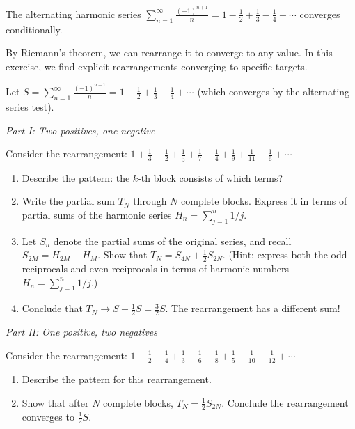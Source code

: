 \documentclass[
  10pt,
  letterpaper,
]{scrbook}
\begin{document}
The alternating harmonic series
\(\sum_{n=1}^{\infty} \frac{(-1)^{n+1}}{n} = 1 - \frac{1}{2} + \frac{1}{3} - \frac{1}{4} + \cdots\)
converges conditionally.

By Riemann's theorem, we can rearrange it to converge to any value. In
this exercise, we find explicit rearrangements converging to specific
targets.

Let
\(S = \sum_{n=1}^{\infty} \frac{(-1)^{n+1}}{n} = 1 - \frac{1}{2} + \frac{1}{3} - \frac{1}{4} + \cdots\)
(which converges by the alternating series test).

\emph{Part I: Two positives, one negative}

Consider the rearrangement:
\(1 + \frac{1}{3} - \frac{1}{2} + \frac{1}{5} + \frac{1}{7} - \frac{1}{4} + \frac{1}{9} + \frac{1}{11} - \frac{1}{6} + \cdots\)

\begin{enumerate}
\def\labelenumi{(\alph{enumi})}
\item
  Describe the pattern: the \(k\)-th block consists of which terms?
\item
  Write the partial sum \(T_N\) through \(N\) complete blocks. Express
  it in terms of partial sums of the harmonic series
  \(H_n = \sum_{j=1}^{n} 1/j\).
\item
  Let \(S_n\) denote the partial sums of the original series, and recall
  \(S_{2M} = H_{2M} - H_M\). Show that
  \(T_N = S_{4N} + \frac{1}{2}S_{2N}\). (Hint: express both the odd
  reciprocals and even reciprocals in terms of harmonic numbers
  \(H_n = \sum_{j=1}^{n} 1/j\).)
\item
  Conclude that \(T_N \to S + \frac{1}{2}S = \frac{3}{2}S\). The
  rearrangement has a different sum!
\end{enumerate}

\emph{Part II: One positive, two negatives}

Consider the rearrangement:
\(1 - \frac{1}{2} - \frac{1}{4} + \frac{1}{3} - \frac{1}{6} - \frac{1}{8} + \frac{1}{5} - \frac{1}{10} - \frac{1}{12} + \cdots\)

\begin{enumerate}
\def\labelenumi{(\alph{enumi})}
\setcounter{enumi}{4}
\item
  Describe the pattern for this rearrangement.
\item
  Show that after \(N\) complete blocks, \(T_N = \frac{1}{2}S_{2N}\).
  Conclude the rearrangement converges to \(\frac{1}{2}S\).
\end{enumerate}
\end{document}
